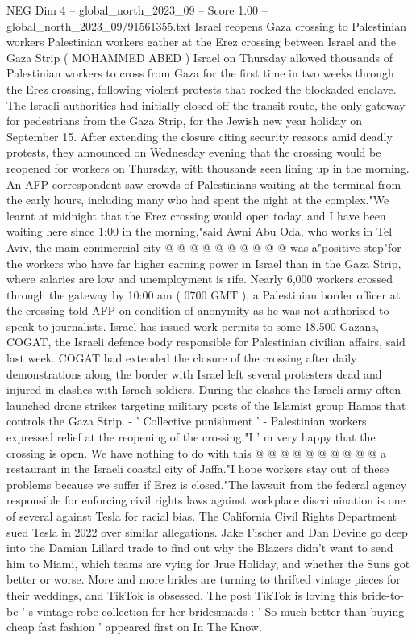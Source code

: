\begin{textsample}{NEG Dim 4 – global\_north\_2023\_09 – Score 1.00 – global\_north\_2023\_09/91561355.txt}  \label{ex:f4_neg_045}
Israel reopens Gaza crossing to Palestinian workers Palestinian workers gather at the Erez crossing between Israel and the Gaza Strip ( MOHAMMED ABED ) Israel on Thursday allowed thousands of Palestinian workers to cross from Gaza for the first time in two weeks through the Erez crossing, following violent protests that rocked the blockaded enclave.
The Israeli authorities had initially closed off the transit route, the only gateway for pedestrians from the Gaza Strip, for the Jewish new year holiday on September 15.
After extending the closure citing security reasons amid deadly protests, they announced on Wednesday evening that the crossing would be reopened for workers on Thursday, with thousands seen lining up in the morning.
An AFP correspondent saw crowds of Palestinians waiting at the terminal from the early hours, including many who had spent the night at the complex."We learnt at midnight that the Erez crossing would open today, and I have been waiting here since 1:00 in the morning,"said Awni Abu Oda, who works in Tel Aviv, the main commercial city @ @ @ @ @ @ @ @ @ @ was a"positive step"for the workers who have far higher earning power in Israel than in the Gaza Strip, where salaries are low and unemployment is rife.
Nearly 6,000 workers crossed through the gateway by 10:00 am ( 0700 GMT ), a Palestinian border officer at the crossing told AFP on condition of anonymity as he was not authorised to speak to journalists.
Israel has issued work permits to some 18,500 Gazans, COGAT, the Israeli defence body responsible for Palestinian civilian affairs, said last week.
COGAT had extended the closure of the crossing after daily demonstrations along the border with Israel left several protesters dead and injured in clashes with Israeli soldiers.
During the clashes the Israeli army often launched drone strikes targeting military posts of the Islamist group Hamas that controls the Gaza Strip. - ' Collective punishment ' - Palestinian workers expressed relief at the reopening of the crossing."I ' m very happy that the crossing is open.
We have nothing to do with this @ @ @ @ @ @ @ @ @ @ a restaurant in the Israeli coastal city of Jaffa."I hope workers stay out of these problems because we suffer if Erez is closed."The lawsuit from the federal agency responsible for enforcing civil rights laws against workplace discrimination is one of several against Tesla for racial bias.
The California Civil Rights Department sued Tesla in 2022 over similar allegations.
Jake Fischer and Dan Devine go deep into the Damian Lillard trade to find out why the Blazers didn't want to send him to Miami, which teams are vying for Jrue Holiday, and whether the Suns got better or worse.
More and more brides are turning to thrifted vintage pieces for their weddings, and TikTok is obsessed.
The post TikTok is loving this bride-to-be ' s vintage robe collection for her bridesmaids : ' So much better than buying cheap fast fashion ' appeared first on In The Know.

\end{textsample}
